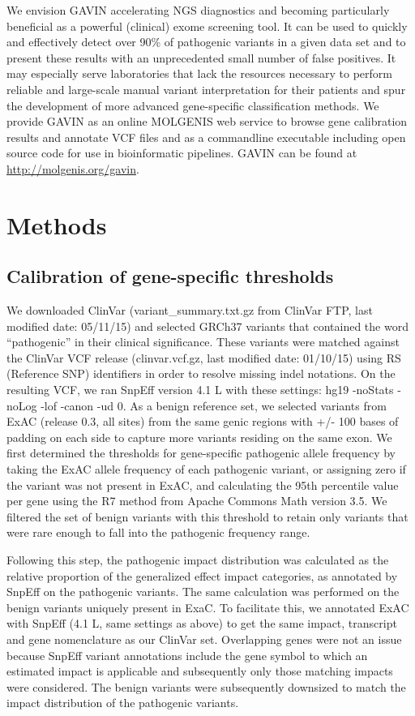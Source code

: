 We envision GAVIN accelerating NGS diagnostics and becoming particularly beneficial as a powerful (clinical) exome screening tool.
It can be used to quickly and effectively detect over 90\% of pathogenic variants in a given data set and to present these results with an unprecedented small number of false positives.
It may especially serve laboratories that lack the resources necessary to perform reliable and large-scale manual variant interpretation for their patients and spur the development of more advanced gene-specific classification methods.
We provide GAVIN as an online MOLGENIS\cite{Swertz_2010a} web service to browse gene calibration results and annotate VCF files and as a commandline executable including open source code for use in bioinformatic pipelines.
GAVIN can be found at \url{http://molgenis.org/gavin}.


\section{Methods}
\label{gavinmethods}

\subsection{Calibration of gene-specific thresholds}
We downloaded ClinVar (variant\_summary.txt.gz from ClinVar FTP, last modified date: 05/11/15) and selected GRCh37 variants that contained the word “pathogenic” in their clinical significance.
These variants were matched against the ClinVar VCF release (clinvar.vcf.gz, last modified date: 01/10/15) using RS (Reference SNP) identifiers in order to resolve missing indel notations.
On the resulting VCF, we ran SnpEff version 4.1 L with these settings: hg19 -noStats -noLog -lof -canon -ud 0.
As a benign reference set, we selected variants from ExAC (release 0.3, all sites) from the same genic regions with +/- 100 bases of padding on each side to capture more variants residing on the same exon.
We first determined the thresholds for gene-specific pathogenic allele frequency by taking the ExAC allele frequency of each pathogenic variant, or assigning zero if the variant was not present in ExAC, and calculating the 95th percentile value per gene using the R7 method from Apache Commons Math version 3.5.
We filtered the set of benign variants with this threshold to retain only variants that were rare enough to fall into the pathogenic frequency range.

Following this step, the pathogenic impact distribution was calculated as the relative proportion of the generalized effect impact categories, as annotated by SnpEff on the pathogenic variants.
The same calculation was performed on the benign variants uniquely present in ExaC.
To facilitate this, we annotated ExAC with SnpEff (4.1 L, same settings as above) to get the same impact, transcript and gene nomenclature as our ClinVar set.
Overlapping genes were not an issue because SnpEff variant annotations include the gene symbol to which an estimated impact is applicable and subsequently only those matching impacts were considered.
The benign variants were subsequently downsized to match the impact distribution of the pathogenic variants.

